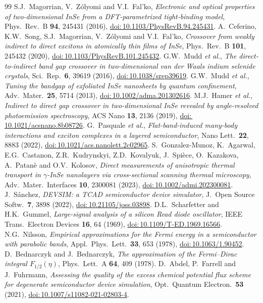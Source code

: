 \documentclass[11pt]{article}
\providecommand{\doi}[1]{\href{https://doi.org/#1}{doi:\,#1}}
\begin{document}
\begin{thebibliography}{99}
 S.J.~Magorrian, V.~Z\'olyomi and V.I.~Fal'ko, \textit{Electronic and optical properties of two-dimensional InSe from a DFT-parametrized tight-binding model}, Phys.\ Rev.\ B \textbf{94}, 245431 (2016), \doi{10.1103/PhysRevB.94.245431}.
 A.~Ceferino, K.W.~Song, S.J.~Magorrian, V.~Z\'olyomi and V.I.~Fal'ko, \textit{Crossover from weakly indirect to direct excitons in atomically thin films of InSe}, Phys.\ Rev.\ B \textbf{101}, 245432 (2020), \doi{10.1103/PhysRevB.101.245432}.
 G.W.~Mudd \textit{et al.}, \textit{The direct-to-indirect band gap crossover in two-dimensional van der Waals indium selenide crystals}, Sci.\ Rep.\ \textbf{6}, 39619 (2016), \doi{10.1038/srep39619}.
 G.W.~Mudd \textit{et al.}, \textit{Tuning the bandgap of exfoliated InSe nanosheets by quantum confinement}, Adv.\ Mater.\ \textbf{25}, 5714 (2013), \doi{10.1002/adma.201302616}.
 M.J.~Hamer \textit{et al.}, \textit{Indirect to direct gap crossover in two-dimensional InSe revealed by angle-resolved photoemission spectroscopy}, ACS Nano \textbf{13}, 2136 (2019), \doi{10.1021/acsnano.8b08726}.
 G.~Pasquale \textit{et al.}, \textit{Flat-band-induced many-body interactions and exciton complexes in a layered semiconductor}, Nano Lett.\ \textbf{22}, 8883 (2022), \doi{10.1021/acs.nanolett.2c02965}.
 S.~Gonzalez-Munoz, K.~Agarwal, E.G.~Castanon, Z.R.~Kudrynskyi, Z.D.~Kovalyuk, J.~Spi\`ece, O.~Kazakova, A.~Patan\`e and O.V.~Kolosov, \textit{Direct measurements of anisotropic thermal transport in $\gamma$-InSe nanolayers via cross-sectional scanning thermal microscopy}, Adv.\ Mater.\ Interfaces \textbf{10}, 2300081 (2023), \doi{10.1002/admi.202300081}.
 J.~S\'anchez, \textit{DEVSIM: a TCAD semiconductor device simulator}, J.\ Open Source Softw.\ \textbf{7}, 3898 (2022), \doi{10.21105/joss.03898}.
 D.L.~Scharfetter and H.K.~Gummel, \textit{Large-signal analysis of a silicon Read diode oscillator}, IEEE Trans.\ Electron Devices \textbf{16}, 64 (1969), \doi{10.1109/T-ED.1969.16566}.
 N.G.~Nilsson, \textit{Empirical approximations for the Fermi energy in a semiconductor with parabolic bands}, Appl.\ Phys.\ Lett.\ \textbf{33}, 653 (1978), \doi{10.1063/1.90452}.
 D.~Bednarczyk and J.~Bednarczyk, \textit{The approximation of the Fermi--Dirac integral $F_{1/2}(\eta)$}, Phys.\ Lett.\ A \textbf{64}, 409 (1978).
 D.~Abdel, P.~Farrell and J.~Fuhrmann, \textit{Assessing the quality of the excess chemical potential flux scheme for degenerate semiconductor device simulation}, Opt.\ Quantum Electron.\ \textbf{53} (2021), \doi{10.1007/s11082-021-02803-4}.

\end{thebibliography}
\end{document}
